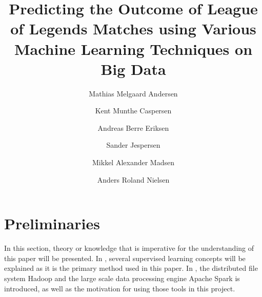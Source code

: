 \documentclass[columns=,boxcolor=white]{datart}
\title{Predicting the Outcome of League of Legends Matches using Various Machine Learning Techniques on Big Data}
\date{}
\author{Mathias Melgaard Andersen}
\author{Kent Munthe Caspersen}
\author{Andreas Berre Eriksen}
\author{Sander Jespersen}
\author{Mikkel Alexander Madsen}
\author{Anders Roland Nielsen}
\affil{Department of Computer Science, Aalborg University}
\begin{document}
\usetikzlibrary{arrows,intersections,shapes.geometric,calc}
\maketitle









\section{Preliminaries}\label{sec:prelim}
In this section, theory or knowledge that is imperative for the understanding of this paper will be presented. In , several supervised learning concepts will be explained as it is the primary method used in this paper. In , the distributed file system Hadoop and the large scale data processing engine Apache Spark is introduced, as well as the motivation for using those tools in this project.










%














\newpage
\appendix

%
%
\end{document}
